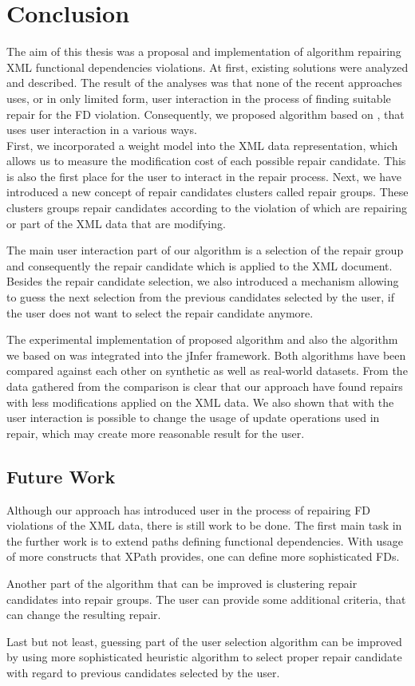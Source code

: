 \chapter{Conclusion}

The aim of this thesis was a proposal and implementation of algorithm repairing XML functional dependencies violations. At first, existing solutions were analyzed and described. The result of the analyses was that none of the recent approaches uses, or in only limited form, user interaction in the process of finding suitable repair for the FD violation. Consequently, we proposed algorithm based on \cite{RepAndConsistentAnswer}, that uses user interaction in a various ways.\\

First, we incorporated a weight model into the XML data representation, which allows us to measure the modification cost of each possible repair candidate. This is also the first place for the user to interact in the repair process. Next, we have introduced a new concept of repair candidates clusters called repair groups. These clusters groups repair candidates according to the violation of which are repairing or part of the XML data that are modifying.

The main user interaction part of our algorithm is a selection of the repair group and consequently the repair candidate which is applied to the XML document. Besides the repair candidate selection, we also introduced a mechanism allowing to guess the next selection from the previous candidates selected by the user, if the user does not want to select the repair candidate anymore.

The experimental implementation of proposed algorithm and also the algorithm we based on was integrated into the jInfer framework. Both algorithms have been compared against each other on synthetic as well as real-world datasets. From the data gathered from the comparison is clear that our approach have found repairs with less modifications applied on the XML data. We also shown that with the user interaction is possible to change the usage of update operations used in repair, which may create more reasonable result for the user.

\section{Future Work}

Although our approach has introduced user in the process of repairing FD violations of the XML data, there is still work to be done. The first main task in the further work is to extend paths defining functional dependencies. With usage of more constructs that XPath provides, one can define more sophisticated FDs.

Another part of the algorithm that can be improved is clustering repair candidates into repair groups. The user can provide some additional criteria, that can change the resulting repair.

Last but not least, guessing part of the user selection algorithm can be improved by using more sophisticated heuristic algorithm to select proper repair candidate with regard to previous candidates selected by the user.
